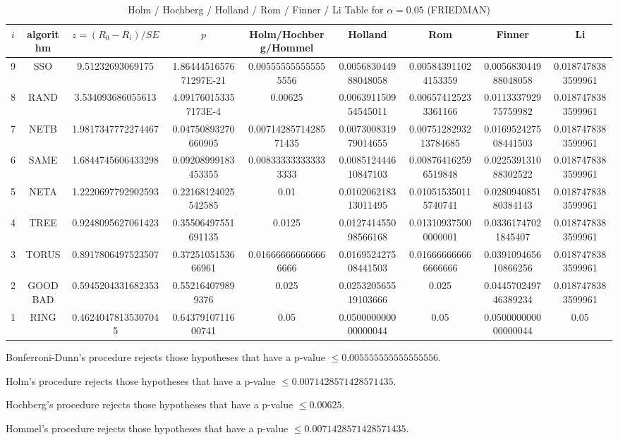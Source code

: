 \documentclass[a4paper,10pt]{article}
\begin{document}
\begin{landscape}
\begin{table}[!htp]
\centering\scriptsize
\caption{Holm / Hochberg / Holland / Rom / Finner / Li Table for $\alpha=0.05$ (FRIEDMAN)}
\begin{tabular}{ccccccccc}
$i$&algorithm&$z=(R_0 - R_i)/SE$&$p$&Holm/Hochberg/Hommel&Holland&Rom&Finner&Li\\
\hline
9& SSO&9.51232693069175&1.8644451657671297E-21&0.005555555555555556&0.005683044988048058&0.005843911024153359&0.005683044988048058&0.0187478383599961\\
8& RAND&3.534093686055613&4.091760153357173E-4&0.00625&0.006391150954545011&0.006574125233361166&0.011333792975759982&0.0187478383599961\\
7& NETB&1.9817347772274467&0.04750893270660905&0.0071428571428571435&0.007300831979014655&0.0075128293213784685&0.016952427508441503&0.0187478383599961\\
6& SAME&1.6844745606433298&0.09208999183453355&0.008333333333333333&0.008512444610847103&0.008764162596519848&0.022539131088302522&0.0187478383599961\\
5& NETA&1.2220697792902593&0.22168124025542585&0.01&0.010206218313011495&0.010515350115740741&0.028094085180384143&0.0187478383599961\\
4& TREE&0.9248095627061423&0.35506497551691135&0.0125&0.012741455098566168&0.013109375000000001&0.03361747021845407&0.0187478383599961\\
3& TORUS&0.8917806497523507&0.3725105153666961&0.016666666666666666&0.016952427508441503&0.016666666666666666&0.039109465610866256&0.0187478383599961\\
2& GOODBAD&0.5945204331682353&0.552164079899376&0.025&0.025320565519103666&0.025&0.044570249746389234&0.0187478383599961\\
1& RING&0.46240478135307045&0.6437910711600741&0.05&0.050000000000000044&0.05&0.050000000000000044&0.05\\
\hline
\end{tabular}
\end{table}
Bonferroni-Dunn's procedure rejects those hypotheses that have a p-value $\le0.005555555555555556$.


Holm's procedure rejects those hypotheses that have a p-value $\le0.0071428571428571435$.


Hochberg's procedure rejects those hypotheses that have a p-value $\le0.00625$.


Hommel's procedure rejects those hypotheses that have a p-value $\le0.0071428571428571435$.



\end{landscape}
\end{document}

